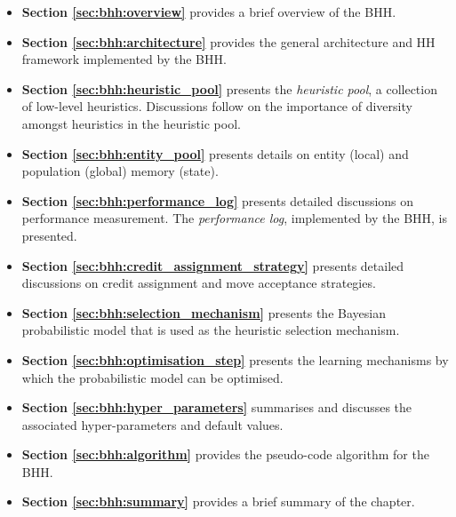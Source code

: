 \begin{itemize}
      \item \textbf{Section \ref{sec:bhh:overview}} provides a brief overview of the \Acs{BHH}.

      \item \textbf{Section \ref{sec:bhh:architecture}} provides the general architecture and \Ac{HH} framework implemented by the \Acs{BHH}.

      \item \textbf{Section \ref{sec:bhh:heuristic_pool}} presents the \textit{heuristic pool}, a collection of low-level heuristics. Discussions follow on the importance of diversity amongst heuristics in the heuristic pool.

      \item \textbf{Section \ref{sec:bhh:entity_pool}} presents details on entity (local) and population (global) memory (state).

      \item \textbf{Section \ref{sec:bhh:performance_log}} presents detailed discussions on performance measurement. The \textit{performance log}, implemented by the \acs{BHH}, is presented.

      \item \textbf{Section \ref{sec:bhh:credit_assignment_strategy}} presents detailed discussions on credit assignment and move acceptance strategies.

      \item \textbf{Section \ref{sec:bhh:selection_mechanism}} presents the Bayesian probabilistic model that is used as the heuristic selection mechanism.

      \item \textbf{Section \ref{sec:bhh:optimisation_step}} presents the learning mechanisms by which the probabilistic model can be optimised.

      \item \textbf{Section \ref{sec:bhh:hyper_parameters}} summarises and discusses the associated hyper-parameters and default values.

      \item \textbf{Section \ref{sec:bhh:algorithm}} provides the pseudo-code algorithm for the \acs{BHH}.

      \item \textbf{Section \ref{sec:bhh:summary}} provides a brief summary of the chapter.
\end{itemize}


